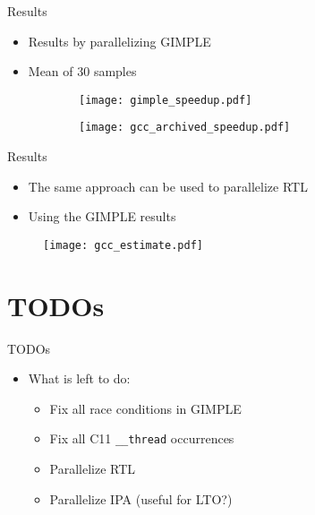 \begin{frame}{Results}
    \begin{itemize}
        \item Results by parallelizing GIMPLE
        \item Mean of 30 samples
    \end{itemize}

\begin{figure}[ht]
\centering
  \begin{subfigure}[b]{0.49\textwidth}
 	\texttt{[image: gimple\_speedup.pdf]}
  \end{subfigure}
  \begin{subfigure}[b]{0.49\textwidth}
 	\texttt{[image: gcc\_archived\_speedup.pdf]}
  \end{subfigure}
\end{figure}
\end{frame}

\begin{frame}{Results}
    \begin{itemize}
        \item The same approach can be used to parallelize RTL
        \item Using the GIMPLE results
    \end{itemize}

\begin{figure}[ht]
\centering
 	\texttt{[image: gcc\_estimate.pdf]}
\end{figure}
\end{frame}

\section{TODOs}

\begin{frame}{TODOs}
    \begin{itemize}
        \item What is left to do:
            \begin{itemize}
                \item Fix all race conditions in GIMPLE
                \item Fix all C11 \texttt{\_\_thread} occurrences
                \item Parallelize RTL
                \item Parallelize IPA (useful for LTO?)
            \end{itemize}
    \end{itemize}
\end{frame}

